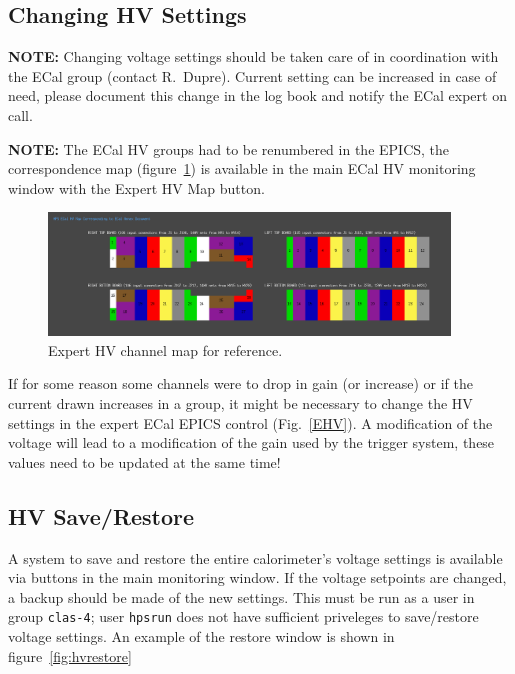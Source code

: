 \documentclass[12pt]{article}
\begin{document}
   \subsection{Changing HV Settings}
      {\bf NOTE:} Changing voltage settings should be taken care of in coordination with the ECal group (contact R.~Dupre). Current setting can be increased in case of need, please document this change in the log book and notify the ECal expert on call.

 {\bf NOTE:} The ECal HV groups had to be renumbered in the EPICS, the correspondence map (figure~\ref{ExpertMap}) is available in the main ECal HV monitoring window with the Expert HV Map button.

\begin{figure}[htbp]
\center
\includegraphics[width=0.95\textwidth]{pics/ecalhv_expertmap_2014_12_15.png}
\caption{\small \label{ExpertMap} Expert HV channel map for reference.}
\end{figure}

      If for some reason some channels were to drop in gain (or increase) or if the current drawn increases in a group, it might be necessary to change the HV settings in the expert ECal EPICS control (Fig.~\ref{EHV}). A modification of the voltage will lead to a modification of the gain used by the trigger system, these values need to be updated at the same time!
      \subsection{HV Save/Restore}
      A system to save and restore the entire calorimeter's voltage settings is available via buttons in the main monitoring window.  If the voltage setpoints are changed, a backup should be made of the new settings.  This must be run as a user in group \texttt{clas-4};  user \texttt{hpsrun} does not have sufficient priveleges to save/restore voltage settings. 
      An example of the restore window is shown in figure~\ref{fig:hvrestore}
\end{document}
